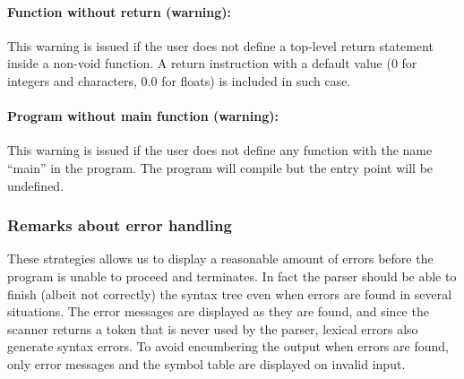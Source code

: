 \paragraph{Function without return (warning):} This warning is issued if the user does not
define a top-level return statement inside a non-void function. A return instruction with
a default value (0 for integers and characters, 0.0 for floats) is included in such case.

\paragraph{Program without main function (warning):} This warning is issued if the user does not
define any function with the name ``main'' in the program. The program will compile but the entry
point will be undefined.

\subsubsection{Remarks about error handling}
These strategies allows us to display a reasonable amount of errors before the program is unable
to proceed and terminates. In fact the parser should be able to finish (albeit not correctly)
the syntax tree even when errors are found in several situations.
The error messages are displayed as they are found, and since the
scanner returns a token that is never used by the parser, lexical errors also generate syntax
errors. To avoid encumbering the output when errors are found, only error messages and the symbol
table are displayed on invalid input.

